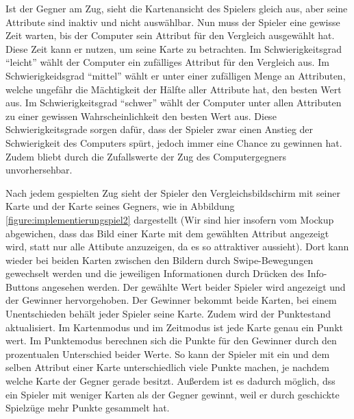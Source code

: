 Ist der Gegner am Zug, sieht die Kartenansicht des Spielers gleich aus, aber seine Attribute sind inaktiv und nicht auswählbar. Nun muss der Spieler eine gewisse Zeit warten, bis der Computer sein Attribut für den Vergleich ausgewählt hat. Diese Zeit kann er nutzen, um seine Karte zu betrachten. Im Schwierigkeitsgrad ``leicht'' wählt der Computer ein zufälliges Attribut für den Vergleich aus. Im Schwierigkeidsgrad ``mittel'' wählt er unter einer zufälligen Menge an Attributen, welche ungefähr die Mächtigkeit der Hälfte aller Attribute hat, den besten Wert aus. Im Schwierigkeitsgrad ``schwer'' wählt der Computer unter allen Attributen zu einer gewissen Wahrscheinlichkeit den besten Wert aus. Diese Schwierigkeitsgrade sorgen dafür, dass der Spieler zwar einen Anstieg der Schwierigkeit des Computers spürt, jedoch immer eine Chance zu gewinnen hat. Zudem bliebt durch die Zufallswerte der Zug des Computergegners unvorhersehbar.

Nach jedem gespielten Zug sieht der Spieler den Vergleichsbildschirm mit seiner Karte und der Karte seines Gegners, wie in Abbildung \ref{figure:implementierungspiel2}  dargestellt (Wir sind hier insofern vom Mockup abgewichen, dass das Bild einer Karte mit dem gewählten Attribut angezeigt wird, statt nur alle Attibute anzuzeigen, da es so attraktiver aussieht). Dort kann wieder bei beiden Karten zwischen den Bildern durch Swipe-Bewegungen gewechselt werden und die jeweiligen Informationen durch Drücken des Info-Buttons angesehen werden. Der gewählte Wert beider Spieler wird angezeigt und der Gewinner hervorgehoben. Der Gewinner bekommt beide Karten, bei einem Unentschieden behält jeder Spieler seine Karte. Zudem wird der Punktestand aktualisiert. Im Kartenmodus und im Zeitmodus ist jede Karte genau ein Punkt wert. Im Punktemodus berechnen sich die Punkte für den Gewinner durch den prozentualen Unterschied beider Werte. So kann der Spieler mit ein und dem selben Attribut einer Karte unterschiedlich viele Punkte machen, je nachdem welche Karte der Gegner gerade besitzt. Außerdem ist es dadurch möglich, dss ein Spieler mit weniger Karten als der Gegner gewinnt, weil er durch geschickte Spielzüge mehr Punkte gesammelt hat.\\

